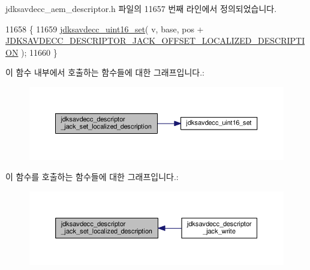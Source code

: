 jdksavdecc\+\_\+aem\+\_\+descriptor.\+h 파일의 11657 번째 라인에서 정의되었습니다.


\begin{DoxyCode}
11658 \{
11659     \hyperlink{group__endian_ga14b9eeadc05f94334096c127c955a60b}{jdksavdecc\_uint16\_set}( v, base, pos + 
      \hyperlink{group__descriptor__jack_gab9473c47632ad9d35450c627bb203420}{JDKSAVDECC\_DESCRIPTOR\_JACK\_OFFSET\_LOCALIZED\_DESCRIPTION}
       );
11660 \}
\end{DoxyCode}


이 함수 내부에서 호출하는 함수들에 대한 그래프입니다.\+:
\nopagebreak
\begin{figure}[H]
\begin{center}
\leavevmode
\includegraphics[width=350pt]{group__descriptor__jack_gabe6dec09b0a44d5b8cfe8dfb4ab0d33a_cgraph}
\end{center}
\end{figure}




이 함수를 호출하는 함수들에 대한 그래프입니다.\+:
\nopagebreak
\begin{figure}[H]
\begin{center}
\leavevmode
\includegraphics[width=350pt]{group__descriptor__jack_gabe6dec09b0a44d5b8cfe8dfb4ab0d33a_icgraph}
\end{center}
\end{figure}


